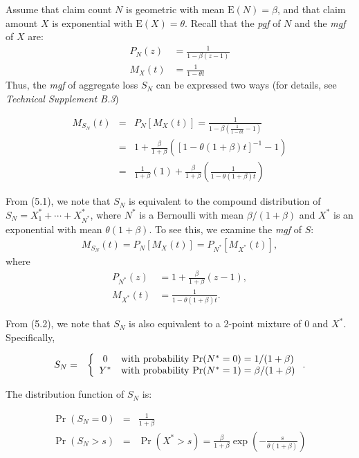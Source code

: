 \documentclass[]{book}
\theoremstyle{definition}
\theoremstyle{definition}
\theoremstyle{definition}
\theoremstyle{remark}
\begin{document}
Assume that claim count \(N\) is geometric with mean
\(\mathrm{E}(N)=\beta\), and that claim amount \(X\) is exponential with
\(\mathrm{E}(X)=\theta\). Recall that the \emph{pgf} of \(N\) and the
\emph{mgf} of \(X\) are: \[\begin{aligned}
P_N (z) &=\frac{1}{1- \beta (z-1)}\\
M_{X}(t) &=\frac{1}{1-\theta t}
\end{aligned}\] Thus, the \emph{mgf} of aggregate loss \(S_N\) can be
expressed two ways (for details, see \emph{Technical Supplement B.3})

\begin{eqnarray}
M_{S_N}(t) &=& P_N [M_{X}(t)] = \frac{1}{1 - \beta \left( \frac{1}{1-\theta t} - 1\right)} \nonumber\\
&=& 1+ \frac{\beta}{1+\beta} \left([1-\theta(1+\beta)t]^{-1}-1 \right)\\
&=& \frac{1}{1+\beta}(1) +\frac{\beta}{1+\beta}
\left( \frac{1}{1-\theta (1+\beta)t}\right)
\end{eqnarray}

From (5.1), we note that \(S_N\) is equivalent to the compound
distribution of \(S_N=X^{*}_1+\cdots+X^{*}_{N^{*}}\), where \(N^{*}\) is
a Bernoulli with mean \(\beta/(1+\beta)\) and \(X^{*}\) is an
exponential with mean \(\theta(1+\beta)\). To see this, we examine the
\emph{mgf} of \(S\): \[\begin{aligned}
M_{S_N}(t) = P_N [M_{X}(t)] = P_{N^{*}} [M_{X^{*}}(t)],
\end{aligned}\] where \[\begin{aligned}
P_{N^*} (z) &=1+ \frac{\beta}{1+ \beta} (z-1),\\
M_{X^*} (t) &=\frac{1}{1- {{\theta(1+\beta)}} t}.
\end{aligned}\]

From (5.2), we note that \(S_N\) is also equivalent to a 2-point mixture
of 0 and \(X^{*}\). Specifically,

\begin{eqnarray*}
S_N &=&
\left\{
\begin{array}{cl}
0 & {\rm with~ probability ~Pr}(N^*=0) = 1/(1+\beta) \\
Y^{*} & {\rm with~ probability ~Pr}(N^*=1) = \beta/(1+\beta)
\end{array}
\right..
\end{eqnarray*}

The distribution function of \(S_N\) is:

\begin{eqnarray*}
\Pr(S_N=0) &=& \frac{1}{1+\beta}\\
\Pr(S_N>s) &=& \Pr(X^*>s) =\frac{\beta}{1+\beta} \exp\left( -\frac{s}{
\theta (1+\beta)}\right)
\end{eqnarray*}
\end{document}

